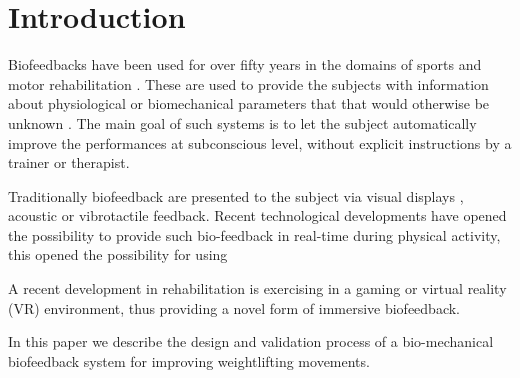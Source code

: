 \documentclass[10pt,letterpaper]{article}
\begin{document}
\section*{Introduction}



Biofeedbacks have been used for over fifty years in the domains of sports \cite{onate2001augmented} and motor rehabilitation \cite{tate2016real,isakov2007gait}. These are used to provide the subjects with information about physiological or biomechanical parameters that that would otherwise be unknown \cite{giggins2013biofeedback}. The main goal of such systems is to let the subject automatically improve the performances at subconscious level, without explicit instructions by a trainer or therapist.

Traditionally biofeedback are presented to the subject via visual displays , acoustic or vibrotactile feedback. Recent technological developments have opened the possibility to provide such bio-feedback in real-time during physical activity, this opened the possibility for using

A recent development in rehabilitation is exercising in a gaming or virtual reality (VR) environment, thus providing a novel form of immersive biofeedback.


In this paper we describe the design and validation process of a bio-mechanical biofeedback system for improving weightlifting movements.
\end{document}
